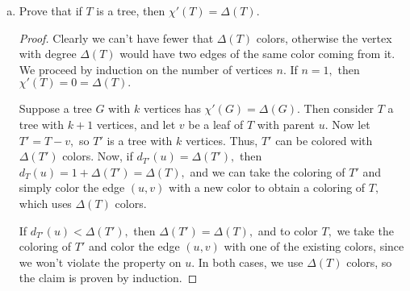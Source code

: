 \documentclass{article}
\begin{document}
\begin{itemize}
\begin{enumerate}[(a)]
\begin{proof}
\begin{center}
					\end{center}

				\end{proof}

			\item Prove that if $T$ is a tree, then $\chi'(T)=\Delta(T).$
				\begin{proof}
					Clearly we can't have fewer that $\Delta(T)$ colors, otherwise the vertex with degree $\Delta(T)$ would have two edges of the same color coming from it. We proceed by induction on the number of vertices $n.$ If $n=1,$ then $\chi'(T)=0=\Delta(T).$ 

					Suppose a tree $G$ with $k$ vertices has $\chi'(G)=\Delta(G).$ Then consider $T$ a tree with $k+1$ vertices, and let $v$ be a leaf of $T$ with parent $u.$ Now let $T'=T-v,$ so $T'$ is a tree with $k$ vertices. Thus, $T'$ can be colored with $\Delta(T')$ colors. Now, if $d_{T'}(u)=\Delta(T'),$ then $d_T(u)=1+\Delta(T') = \Delta(T),$ and we can take the coloring of $T'$ and simply color the edge $(u, v)$ with a new color to obtain a coloring of $T,$ which uses $\Delta(T)$ colors. 
					
					If $d_{T'}(u)< \Delta(T'),$ then $\Delta(T')=\Delta(T),$ and to color $T,$ we take the coloring of $T'$ and color the edge $(u, v)$ with one of the existing colors, since we won't violate the property on $u.$ In both cases, we use $\Delta(T)$ colors, so the claim is proven by induction.
				\end{proof}


\end{enumerate}
\end{itemize}
\end{document}

